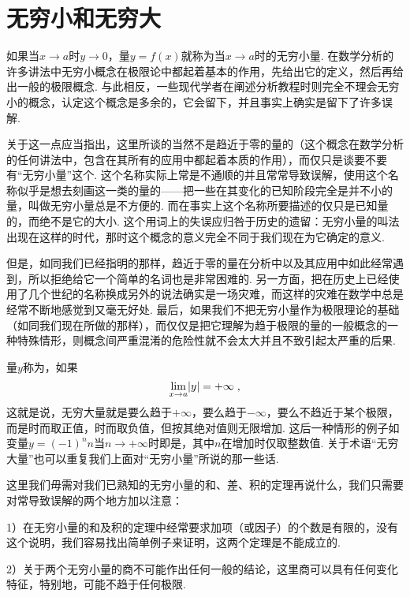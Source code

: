 \documentclass[color=cyan,mathpazo,titlestyle=hang]{elegantbook_mac}
\begin{document}
\section{无穷小和无穷大}

如果当$x\to a$时$y\to 0$，量$y=f(x)$就称为当$x\to a$时的无穷小量. 在数学分析的许多讲法中无穷小概念在极限论中都起着基本的作用，先给出它的定义，然后再给出一般的极限概念. 与此相反，一些现代学者在阐述分析教程时则完全不理会无穷小的概念，认定这个概念是多余的，它会留下，并且事实上确实是留下了许多误解. 

关于这一点应当指出，这里所谈的当然不是趋近于零的量的（这个概念在数学分析的任何讲法中，包含在其所有的应用中都起着本质的作用），而仅只是谈要不要有``无穷小量''这个. 这个名称实际上常是不通顺的并且常常导致误解，使用这个名称似乎是想去刻画这一类的量的——把一些在其变化的已知阶段完全是并不小的量，叫做无穷小量总是不方便的. 而在事实上这个名称所要描述的仅只是已知量的，而绝不是它的大小. 这个用词上的失误应归咎于历史的遗留：无穷小量的叫法出现在这样的时代，那时这个概念的意义完全不同于我们现在为它确定的意义. 

但是，如同我们已经指明的那样，趋近于零的量在分析中以及其应用中如此经常遇到，所以拒绝给它一个简单的名词也是非常困难的. 另一方面，把在历史上已经使用了几个世纪的名称换成另外的说法确实是一场灾难，而这样的灾难在数学中总是经常不断地感觉到又毫无好处. 最后，如果我们不把无穷小量作为极限理论的基础（如同我们现在所做的那样），而仅仅是把它理解为趋于极限的量的一般概念的一种特殊情形，则概念间严重混淆的危险性就不会太大并且不致引起太严重的后果. 

量$y$称为，如果
$$
\lim_{x\to a}\abs{y} = +\infty\; ,
$$
这就是说，无穷大量就是要么趋于$+\infty$，要么趋于$-\infty$，要么不趋近于某个极限，而是时而取正值，时而取负值，但按其绝对值则无限增加. 这后一种情形的例子如变量$y=(-1)^n n$当$n\to +\infty$时即是，其中$n$在增加时仅取整数值. 关于术语``无穷大量''也可以重复我们上面对``无穷小量''所说的那一些话. 

这里我们毋需对我们已熟知的无穷小量的和、差、积的定理再说什么，我们只需要对常导致误解的两个地方加以注意：

1）在无穷小量的和及积的定理中经常要求加项（或因子）的个数是有限的，没有这个说明，我们容易找出简单例子来证明，这两个定理是不能成立的. 

2）关于两个无穷小量的商不可能作出任何一般的结论，这里商可以具有任何变化特征，特别地，可能不趋于任何极限. 
\end{document}
